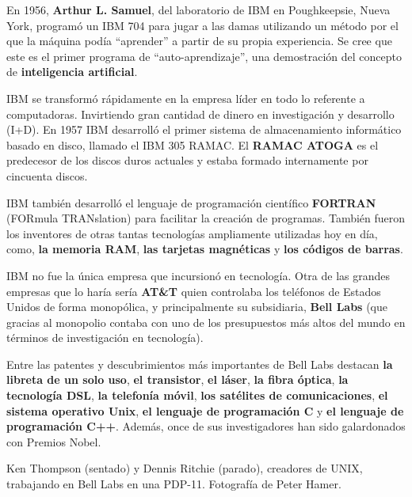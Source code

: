\begin{knowwhat}
    En 1956, \textbf{Arthur L. Samuel}, del laboratorio de IBM en Poughkeepsie,
    Nueva York, programó un IBM 704 para jugar a las damas utilizando un método
    por el que la máquina podía ``aprender'' a partir de su propia experiencia.
    Se cree que este es el primer programa de ``auto-aprendizaje'', una
    demostración del concepto de \textbf{inteligencia artificial}.
\end{knowwhat}

IBM se transformó rápidamente en la empresa líder en todo lo referente a
computadoras. Invirtiendo gran cantidad de dinero en investigación y desarrollo
(I+D). En 1957 IBM desarrolló el primer sistema de almacenamiento informático
basado en disco, llamado el IBM 305 RAMAC. El \textbf{RAMAC ATOGA} es el
predecesor de los discos duros actuales y estaba formado internamente por
cincuenta discos.\autocite{pugh_1996}

\begin{knowwhat}
    IBM también desarrolló el lenguaje de programación científico
    \textbf{FORTRAN} (FORmula TRANslation) para facilitar la creación de
    programas. También fueron los inventores de otras tantas tecnologías
    ampliamente utilizadas hoy en día, como, \textbf{la memoria RAM},
    \textbf{las tarjetas magnéticas} y \textbf{los códigos de barras}.
\end{knowwhat}

IBM no fue la única empresa que incursionó en tecnología. Otra de las grandes
empresas que lo haría sería \textbf{AT\&T} quien controlaba los teléfonos de
Estados Unidos de forma monopólica, y principalmente su subsidiaria,
\textbf{Bell Labs} (que gracias al monopolio contaba con uno de los presupuestos
más altos del mundo en términos de investigación en tecnología).

Entre las patentes y descubrimientos más importantes de Bell Labs destacan
\textbf{la libreta de un solo uso}, \textbf{el transistor}, \textbf{el láser},
\textbf{la fibra óptica}, \textbf{la tecnología DSL}, \textbf{la telefonía
móvil}, \textbf{los satélites de comunicaciones}, \textbf{el sistema operativo
Unix}, \textbf{el lenguaje de programación C} y \textbf{el lenguaje de
programación C++}. Además, once de sus investigadores han sido galardonados con
Premios Nobel.\autocite{gertner_2013}

{Ken Thompson (sentado) y Dennis Ritchie (parado), creadores de UNIX, trabajando
en Bell Labs en una PDP-11.} {Fotografía de Peter Hamer.}

